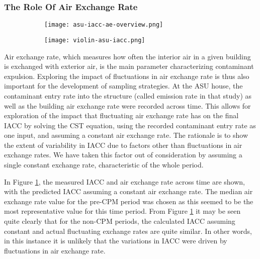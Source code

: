 \documentclass[journal=esthag,manuscript=article]{achemso}
\begin{document}
\subsubsection{The Role Of Air Exchange Rate}

\begin{figure}[htb!]
  \caption{Comparison between the recorded  and the calculated TCE in indoor air at the ASU house, assuming constant air exchange rate. \ref{fig:asu_exchange_rate_analysis_overview} shows the TCE in indoor air across time as well as the exchange rate. \ref{fig:asu_exchange_rate_analysis_violin_plot} shows the distribution of these values for three periods.}
  \label{fig:asu_exchange_rate_analysis}
  \begin{subfigure}{\textwidth}
    \caption{ }
    \label{fig:asu_exchange_rate_analysis_overview}
    \texttt{[image: asu-iacc-ae-overview.png]}
  \end{subfigure}
  \begin{subfigure}{0.75\textwidth}
    \caption{ }
    \label{fig:asu_exchange_rate_analysis_violin_plot}
    \texttt{[image: violin-asu-iacc.png]}
  \end{subfigure}
\end{figure}

Air exchange rate, which measures how often the interior air in a given building is exchanged with exterior air, is the main parameter characterizing contaminant expulsion.
Exploring the impact of fluctuations in air exchange rate is thus also important for the development of sampling strategies.
At the ASU house, the contaminant entry rate into the structure (called emission rate in that study) as well as the building air exchange rate were recorded across time.
This allows for exploration of the impact that fluctuating air exchange rate has on the final IACC by solving the CST equation, using the recorded contaminant entry rate as one input, and assuming a constant air exchange rate.
The rationale is to show the extent of variability in IACC due to factors other than fluctuations in air exchange rates.
We have taken this factor out of consideration by assuming a single constant exchange rate, characteristic of the whole period.

In Figure \ref{fig:asu_exchange_rate_analysis_overview}, the measured IACC and air exchange rate across time are shown, with the predicted IACC assuming a constant air exchange rate.
The median air exchange rate value for the pre-CPM period was chosen as this seemed to be the most representative value for this time period.
From Figure \ref{fig:asu_exchange_rate_analysis_overview} it may be seen quite clearly that for the non-CPM periods, the calculated IACC assuming constant and actual fluctuating exchange rates are quite similar.
In other words, in this instance it is unlikely that the variations in IACC were driven by fluctuations in air exchange rate.
\end{document}

